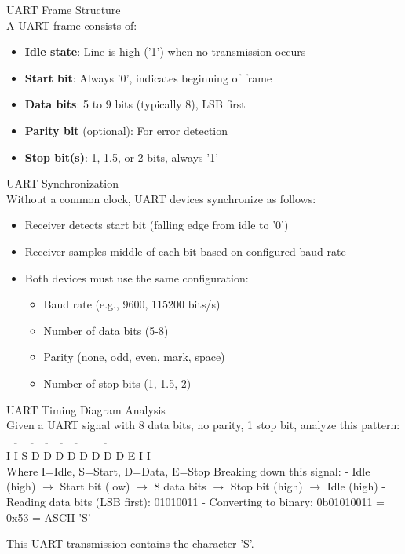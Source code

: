 
\begin{definition}{UART Frame Structure}\\
A UART frame consists of:
\begin{itemize}
    \item \textbf{Idle state}: Line is high ('1') when no transmission occurs
    \item \textbf{Start bit}: Always '0', indicates beginning of frame
    \item \textbf{Data bits}: 5 to 9 bits (typically 8), LSB first
    \item \textbf{Parity bit} (optional): For error detection
    \item \textbf{Stop bit(s)}: 1, 1.5, or 2 bits, always '1'
\end{itemize}
\end{definition}

\begin{concept}{UART Synchronization}\\
Without a common clock, UART devices synchronize as follows:
\begin{itemize}
    \item Receiver detects start bit (falling edge from idle to '0')
    \item Receiver samples middle of each bit based on configured baud rate
    \item Both devices must use the same configuration:
    \begin{itemize}
        \item Baud rate (e.g., 9600, 115200 bits/s)
        \item Number of data bits (5-8)
        \item Parity (none, odd, even, mark, space)
        \item Number of stop bits (1, 1.5, 2)
    \end{itemize}
\end{itemize}
\end{concept}

\begin{example2}{UART Timing Diagram Analysis}\\
Given a UART signal with 8 data bits, no parity, 1 stop bit, analyze this pattern:
\\
$\overline{\text{\_\_\_\_\_}}$ $\overline{\text{\_\_}}$ $\overline{\text{\_\_\_\_}}$ $\overline{\text{\_\_}}$ $\overline{\text{\_\_\_\_}}$ $\overline{\text{\_\_\_\_\_\_\_\_\_\_}}$
\\
I I S D D D D D D D D E I I
\\
Where I=Idle, S=Start, D=Data, E=Stop
\tcblower
Breaking down this signal:
- Idle (high) $\rightarrow$ Start bit (low) $\rightarrow$ 8 data bits $\rightarrow$ Stop bit (high) $\rightarrow$ Idle (high)
- Reading data bits (LSB first): 01010011
- Converting to binary: 0b01010011 = 0x53 = ASCII 'S'

This UART transmission contains the character 'S'.
\end{example2}

